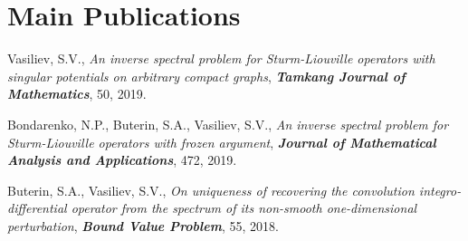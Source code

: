 \section{Main Publications}
\vspace{\topsep}
\begin{tightemize}
    \item Vasiliev, S.V., \textit{An inverse spectral problem for Sturm-Liouville operators with singular potentials on arbitrary compact graphs}, \textit{\textbf{Tamkang Journal of Mathematics}}, 50, 2019.

    \item Bondarenko, N.P., Buterin, S.A., Vasiliev, S.V., \textit{An inverse spectral problem for Sturm-Liouville operators with frozen argument}, \textit{\textbf{Journal of Mathematical Analysis and Applications}}, 472, 2019.

    \item Buterin, S.A., Vasiliev, S.V.,
    \textit{On uniqueness of recovering the convolution integro-differential operator from the spectrum of its non-smooth one-dimensional perturbation}, \textit{\textbf{Bound Value Problem}}, 55, 2018.
\end{tightemize}
\sectionsep